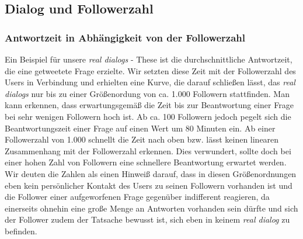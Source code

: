\documentclass[main.tex]{subfiles}
\begin{document}
\subsection{Dialog und Followerzahl}



\subsubsection{Antwortzeit in Abhängigkeit von der  Followerzahl}

Ein Beispiel für unsere \textit{real dialogs} - These ist die durchschnittliche Antwortzeit, die eine getweetete Frage erzielte. Wir setzten diese Zeit mit der Followerzahl des Users in Verbindung und erhielten eine Kurve, die darauf schließen lässt, das \textit{real dialogs} nur bis zu einer Größenordung von ca. 1.000 Followern stattfinden. Man kann erkennen, dass erwartungsgemäß die Zeit bis zur Beantwortung einer Frage bei sehr wenigen Followern hoch ist. Ab ca. 100 Followern jedoch pegelt sich die Beantwortungszeit einer Frage auf einen Wert um 80 Minuten ein. Ab einer Followerzahl von 1.000 schnellt die Zeit nach oben bzw. lässt keinen linearen Zusammenhang mit der Followerzahl erkennen. Dies verwundert, sollte doch bei einer hohen Zahl von Followern eine schnellere Beantwortung erwartet werden. Wir deuten die Zahlen als einen Hinweiß darauf, dass in diesen Größenordnungen eben kein persönlicher Kontakt des Users zu seinen Followern vorhanden ist und die Follower einer aufgeworfenen Frage gegenüber indifferent reagieren, da einerseits ohnehin eine große Menge an Antworten vorhanden sein dürfte und sich der Follower zudem der Tatsache bewusst ist, sich eben in keinem \textit{real dialog} zu befinden.


\begin{center}
\end{center}
\end{document}
